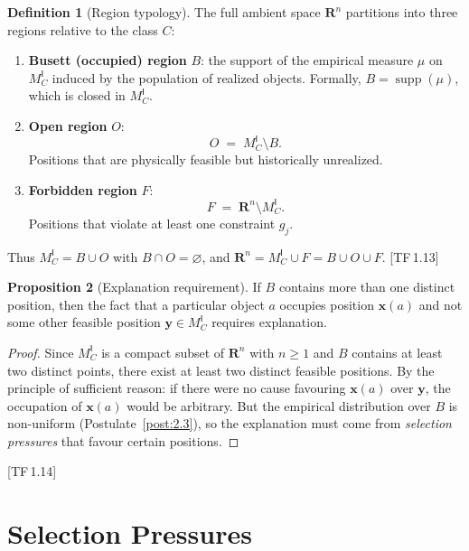 \documentclass[10pt]{article}
\theoremstyle{definition}
\newtheorem{definition}{Definition}[section]
\newtheorem{proposition}[definition]{Proposition}
\theoremstyle{plain}
\theoremstyle{remark}
\newcommand{\MC}{M^{\mathsf{I}}_C}          %
\providecommand{\Rn}{}
\renewcommand{\Rn}{\mathbf{R}^n}            %
\DeclareMathOperator{\supp}{supp}
\newcommand{\TF}[1]{\textnormal{[TF\,#1]}}  %
\begin{document}
\begin{definition}[Region typology]\label{def:1.2}
The full ambient space $\Rn$ partitions into three regions relative to
the class $C$:
\begin{enumerate}[label=(\roman*),nosep]
  \item \textbf{Busett (occupied) region} $B$:
    the support of the empirical measure $\mu$ on $\MC$
    induced by the population of realized objects.
    Formally, $B = \supp(\mu)$, which is closed in $\MC$.

  \item \textbf{Open region} $O$:
    \[
      O \;=\; \MC \setminus B.
    \]
    Positions that are physically feasible but historically unrealized.

  \item \textbf{Forbidden region} $F$:
    \[
      F \;=\; \Rn \setminus \MC.
    \]
    Positions that violate at least one constraint $g_j$.
\end{enumerate}
Thus $\MC = B \cup O$ with $B \cap O = \varnothing$, and
$\Rn = \MC \cup F = B \cup O \cup F$.  \TF{1.13}
\end{definition}

\begin{proposition}[Explanation requirement]\label{prop:1.4}
If $B$ contains more than one distinct position,
then the fact that a particular object $a$ occupies position
$\bm{x}(a)$ and not some other feasible position $\bm{y} \in \MC$
requires explanation.

\begin{proof}
Since $\MC$ is a compact subset of $\Rn$ with $n \geq 1$ and $B$
contains at least two distinct points,
there exist at least two distinct feasible positions. By the principle of
sufficient reason: if there were no cause favouring $\bm{x}(a)$
over $\bm{y}$, the occupation of $\bm{x}(a)$ would be arbitrary.
But the empirical distribution over $B$ is non-uniform
(Postulate~\ref{post:2.3}), so the explanation must come from
\emph{selection pressures} that favour certain positions. \qedhere
\end{proof}
\end{proposition}

\TF{1.14}

\newpage
\section{Selection Pressures}\label{sec:pressures}
\end{document}
